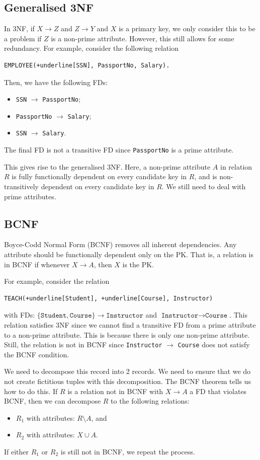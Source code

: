 \documentclass[a4paper, openany]{memoir}
\begin{document}
\subsection{Generalised 3NF}
In 3NF, if $X \to Z$ and $Z \to Y$ and $X$ is a primary key, we only consider this to be a problem if $Z$ is a non-prime attribute. However, this still allows for some redundancy. For example, consider the following relation
\begin{Verbatim}[commandchars=+\[\]]
EMPLOYEE(+underline[SSN], PassportNo, Salary).
\end{Verbatim}
Then, we have the following FDs:
\begin{itemize}
    \item \texttt{SSN} $\to$ \texttt{PassportNo};
    \item \texttt{PassportNo} $\to$ \texttt{Salary};
    \item \texttt{SSN} $\to$ \texttt{Salary}.
\end{itemize}
The final FD is not a transitive FD since \texttt{PassportNo} is a prime attribute.

This gives rise to the generalised 3NF. Here, a non-prime attribute $A$ in relation $R$ is fully functionally dependent on every candidate key in $R$, and is non-transitively dependent on every candidate key in $R$. We still need to deal with prime attributes.

\subsection{BCNF}
Boyce-Codd Normal Form (BCNF) removes all inherent dependencies. Any attribute should be functionally dependent only on the PK. That is, a relation is in BCNF if whenever $X \to A$, then $X$ is the PK.

For example, consider the relation
\begin{Verbatim}[commandchars=+\[\]]
TEACH(+underline[Student], +underline[Course], Instructor)
\end{Verbatim}
with FDs: $\{\texttt{Student}, \texttt{Course}\} \to \texttt{Instructor}$ and $\texttt{Instructor} \to \texttt{Course}$. This relation satisfies 3NF since we cannot find a transitive FD from a prime attribute to a non-prime attribute. This is because there is only one non-prime attribute. Still, the relation is not in BCNF since \texttt{Instructor} $\to$ \texttt{Course} does not satisfy the BCNF condition. 

We need to decompose this record into 2 records. We need to ensure that we do not create fictitious tuples with this decomposition. The BCNF theorem tells us how to do this. If $R$ is a relation not in BCNF with $X \to A$ a FD that violates BCNF, then we can decompose $R$ to the following relations:
\begin{itemize}
    \item $R_1$ with attributes: $R \setminus A$, and
    \item $R_2$ with attributes: $X \cup A$.
\end{itemize}
If either $R_1$ or $R_2$ is still not in BCNF, we repeat the process.
\end{document}
